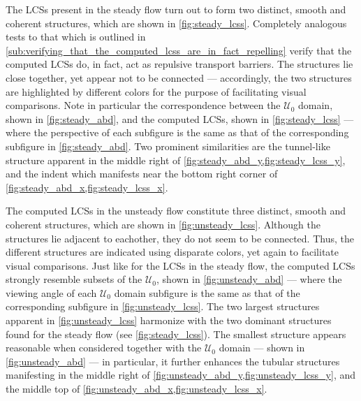 

The LCSs present in the steady flow turn out to form two distinct,
smooth and coherent structures, which are shown in \cref{fig:steady_lcss}.
Completely analogous tests to that which is outlined in
\cref{sub:verifying_that_the_computed_lcss_are_in_fact_repelling} verify that
the computed LCSs do, in fact, act as repulsive transport barriers. The
structures lie close together, yet appear not to be connected --- accordingly,
the two structures are highlighted by different colors for the purpose of
facilitating visual comparisons. Note in particular the correspondence between
the $\mathcal{U}_{0}$  domain, shown in \cref{fig:steady_abd}, and the computed
LCSs, shown in \cref{fig:steady_lcss} --- where the perspective of each
subfigure is the same as that of the corresponding subfigure in
\cref{fig:steady_abd}. Two prominent similarities are the tunnel-like structure
apparent in the middle right of \cref{fig:steady_abd_y,fig:steady_lcss_y}, and
the indent which manifests near the bottom right corner of
\cref{fig:steady_abd_x,fig:steady_lcss_x}.



The computed LCSs in the unsteady flow constitute three distinct, smooth and
coherent structures, which are shown in \cref{fig:unsteady_lcss}. Although
the structures lie adjacent to eachother, they do not seem to be connected.
Thus, the different structures are indicated using disparate colors, yet
again to facilitate visual comparisons. Just like for the LCSs in the steady
flow, the computed LCSs strongly resemble subsets of the $\mathcal{U}_{0}$,
shown in \cref{fig:unsteady_abd} --- where the viewing angle of each
$\mathcal{U}_{0}$ domain subfigure is the same as that of the corresponding
subfigure in \cref{fig:unsteady_lcss}. The two largest structures apparent in
\cref{fig:unsteady_lcss} harmonize with the two dominant structures found for
the steady flow (see \cref{fig:steady_lcss}). The smallest structure appears
reasonable when considered together with the $\mathcal{U}_{0}$ domain --- shown
in \cref{fig:unsteady_abd} --- in particular, it further enhances the
tubular structures manifesting in the middle right of
\cref{fig:unsteady_abd_y,fig:unsteady_lcss_y}, and the middle top of
\cref{fig:unsteady_abd_x,fig:unsteady_lcss_x}.



